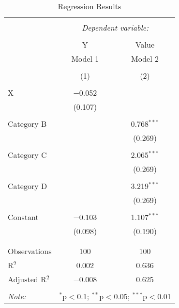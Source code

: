 
\begin{table}[!htbp] \centering 
  \caption{Regression Results} 
  \label{} 
\begin{tabular}{@{\extracolsep{5pt}}lcc} 
\\[-1.8ex]\hline 
\hline \\[-1.8ex] 
 & \multicolumn{2}{c}{\textit{Dependent variable:}} \\ 
\cline{2-3} 
\\[-1.8ex] & Y & Value \\ 
 & Model 1 & Model 2 \\ 
\\[-1.8ex] & (1) & (2)\\ 
\hline \\[-1.8ex] 
 X & $-$0.052 &  \\ 
  & (0.107) &  \\ 
  & & \\ 
 Category B &  & 0.768$^{***}$ \\ 
  &  & (0.269) \\ 
  & & \\ 
 Category C &  & 2.065$^{***}$ \\ 
  &  & (0.269) \\ 
  & & \\ 
 Category D &  & 3.219$^{***}$ \\ 
  &  & (0.269) \\ 
  & & \\ 
 Constant & $-$0.103 & 1.107$^{***}$ \\ 
  & (0.098) & (0.190) \\ 
  & & \\ 
\hline \\[-1.8ex] 
Observations & 100 & 100 \\ 
R$^{2}$ & 0.002 & 0.636 \\ 
Adjusted R$^{2}$ & $-$0.008 & 0.625 \\ 
\hline 
\hline \\[-1.8ex] 
\textit{Note:}  & \multicolumn{2}{r}{$^{*}$p$<$0.1; $^{**}$p$<$0.05; $^{***}$p$<$0.01} \\ 
\end{tabular} 
\end{table} 
